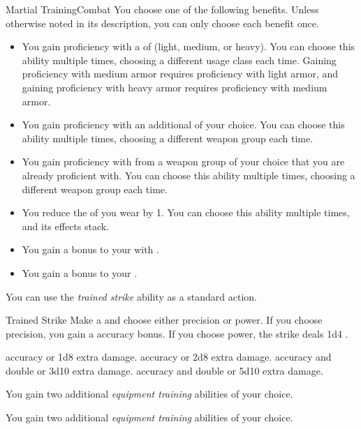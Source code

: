     \begin{feat}{Martial Training}{Combat}
         You choose one of the following benefits.
        Unless otherwise noted in its description, you can only choose each benefit once.
        \begin{itemize}
            \item You gain proficiency with a  of  (light, medium, or heavy).
                You can choose this ability multiple times, choosing a different usage class each time.
                Gaining proficiency with medium armor requires proficiency with light armor, and gaining proficiency with heavy armor requires proficiency with medium armor.
            \item You gain proficiency with an additional  of your choice.
                You can choose this ability multiple times, choosing a different weapon group each time.
            \item You gain proficiency with  from a weapon group of your choice that you are already proficient with.
                You can choose this ability multiple times, choosing a different weapon group each time.
            \item You reduce the  of  you wear by 1.
                You can choose this ability multiple times, and its effects stack.
            \item You gain a  bonus to your  with .
            \item You gain a  bonus to your .
        \end{itemize}

         You can use the \textit{trained strike} ability as a standard action.
        \begin{activeability}{Trained Strike}
            \rankline
            Make a  and choose either precision or power.
            If you choose precision, you gain a  accuracy bonus.
            If you choose power, the strike deals 1d4 .

            \rankline
              accuracy or 1d8 extra damage.
              accuracy or 2d8 extra damage.
              accuracy and double  or 3d10 extra damage.
              accuracy and double  or 5d10 extra damage.
        \end{activeability}

         You gain two additional \textit{equipment training} abilities of your choice.

         You gain two additional \textit{equipment training} abilities of your choice.
    \end{feat}


